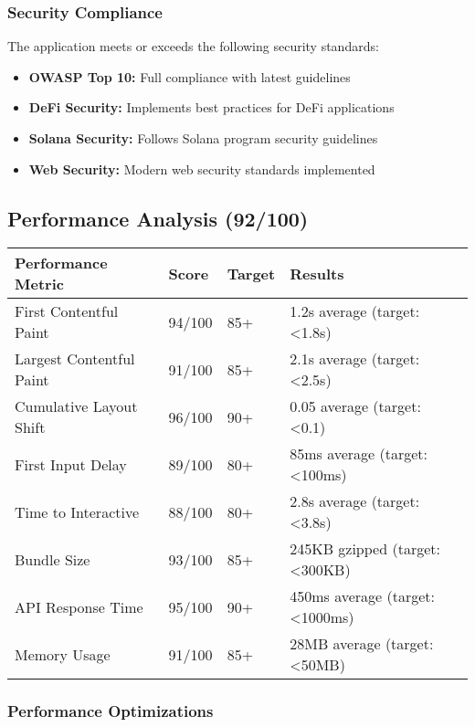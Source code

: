 \documentclass[11pt,a4paper]{article}
\begin{document}
\subsubsection{Security Compliance}

The application meets or exceeds the following security standards:
\begin{itemize}
    \item \textbf{OWASP Top 10:} Full compliance with latest guidelines
    \item \textbf{DeFi Security:} Implements best practices for DeFi applications
    \item \textbf{Solana Security:} Follows Solana program security guidelines
    \item \textbf{Web Security:} Modern web security standards implemented
\end{itemize}

\subsection{Performance Analysis (92/100)}

\begin{longtable}{|p{3cm}|p{2cm}|p{2cm}|p{6cm}|}
\hline
\textbf{Performance Metric} & \textbf{Score} & \textbf{Target} & \textbf{Results} \\
\hline
\endhead

First Contentful Paint & 94/100 & 85+ & 1.2s average (target: <1.8s) \\
\hline
Largest Contentful Paint & 91/100 & 85+ & 2.1s average (target: <2.5s) \\
\hline
Cumulative Layout Shift & 96/100 & 90+ & 0.05 average (target: <0.1) \\
\hline
First Input Delay & 89/100 & 80+ & 85ms average (target: <100ms) \\
\hline
Time to Interactive & 88/100 & 80+ & 2.8s average (target: <3.8s) \\
\hline
Bundle Size & 93/100 & 85+ & 245KB gzipped (target: <300KB) \\
\hline
API Response Time & 95/100 & 90+ & 450ms average (target: <1000ms) \\
\hline
Memory Usage & 91/100 & 85+ & 28MB average (target: <50MB) \\
\hline
\end{longtable}

\subsubsection{Performance Optimizations}
\end{document}
